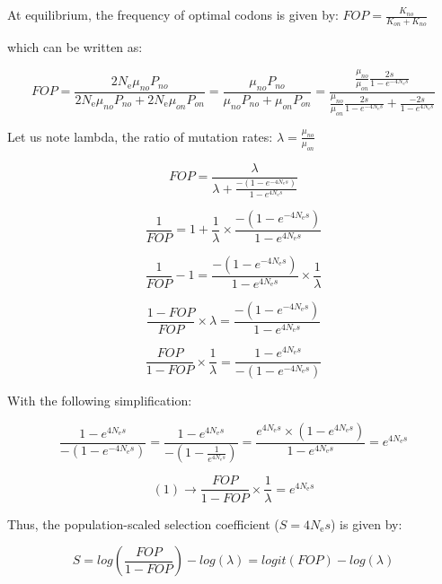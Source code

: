 At equilibrium, the frequency of optimal codons is given by: \(FOP =  \frac{K_{no}}{K_{on} + K_{no}}\)

which can be written as:

\[FOP =  \frac{2 \textit{N}_{\text{e}} \mu_{no} P_{no}}{2 \textit{N}_{\text{e}} \mu_{no} P_{no}+2 \textit{N}_{\text{e}} \mu_{on} P_{on}}
=  \frac{\mu_{no} P_{no}}{\mu_{no} P_{no}+ \mu_{on} P_{on}} =  \frac{\frac{\mu_{no}}{\mu_{on}}  \frac{2s}{1 - e^{-4 \textit{N}_{\text{e}} s} }}{\frac{\mu_{no}}{\mu_{on}}  \frac{2s}{1 - e^{-4 \textit{N}_{\text{e}} s} } + \frac{-2s}{1 - e^{4 \textit{N}_{\text{e}} s} } }
\]

Let us note lambda, the ratio of mutation rates: $\lambda = \frac{\mu_{no}}{\mu_{on}}$

\[FOP =  \frac{\lambda}{\lambda + \frac{-(1 - e^{-4 \textit{N}_{\text{e}} s})}{1 - e^{4 \textit{N}_{\text{e}} s}}}
\]

\[\frac{1}{FOP} = 1 +   \frac{1}{\lambda} \times \frac{-(1 - e^{-4 \textit{N}_{\text{e}} s})}{1 - e^{4 \textit{N}_{\text{e}} s}}
\]

\[\frac{1}{FOP} - 1 =   \frac{-(1 - e^{-4 \textit{N}_{\text{e}} s})}{1 - e^{4 \textit{N}_{\text{e}} s}} \times \frac{1}{\lambda} 
\]

\[\frac{1-FOP}{FOP} \times \lambda = \frac{-(1 - e^{-4 \textit{N}_{\text{e}} s})}{1 - e^{4 \textit{N}_{\text{e}} s}} 
\]

\setcounter{equation}{0}
\begin{equation}
\frac{FOP}{1-FOP} \times \frac{1}{\lambda}  = \frac{1 - e^{4 \textit{N}_{\text{e}} s}}{-(1 - e^{-4 \textit{N}_{\text{e}} s})} 
\end{equation}

\newpage

With the following simplification:

\[ \frac{1 - e^{4 \textit{N}_{\text{e}} s}}{-(1 - e^{-4 \textit{N}_{\text{e}} s})} = \frac{1 - e^{4 \textit{N}_{\text{e}} s}}{-(1 - \frac{1}{e^{4 \textit{N}_{\text{e}} s}})} 
 = \frac{e^{4 \textit{N}_{\text{e}} s} \times (1-e^{4 \textit{N}_{\text{e}} s})}{1 - e^{4 \textit{N}_{\text{e}} s}} = e^{4 \textit{N}_{\text{e}} s}
\]

\[ (1) \rightarrow \frac{FOP}{1-FOP} \times \frac{1}{\lambda} = e^{4 \textit{N}_{\text{e}} s}
\]


Thus, the population-scaled selection coefficient ($S=4 \textit{N}_{\text{e}} s$) is given by:

\[ S = log(\frac{FOP}{1-FOP}) - log(\lambda) = logit(FOP) - log(\lambda)
\]

